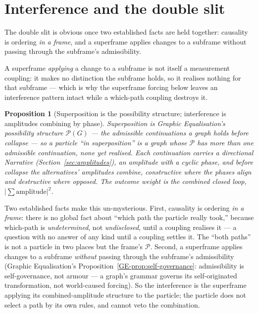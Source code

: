 \documentclass[11pt,a4paper]{article}
\newtheorem{proposition}[definition]{Proposition}
\theoremstyle{remark}\newtheorem{remark}[definition]{Remark}
\begin{document}
\section{Interference and the double slit}\label{sec:interference}
The double slit is obvious once two established facts are held together: causality
is ordering \emph{in a frame}, and a superframe applies changes to a subframe
without passing through the subframe's admissibility.

A superframe \emph{applying} a change to a subframe is not itself a measurement
coupling: it makes no distinction the subframe holds, so it realises nothing for
that subframe --- which is why the superframe forcing below leaves an interference
pattern intact while a which-path coupling destroys it.

\begin{proposition}[Superposition is the possibility structure; interference is amplitudes combining by phase]\label{prop:interference}
Superposition is Graphic Equalisation's possibility structure $\mathcal P(G)$ ---
the admissible continuations a graph holds before collapse --- so a particle ``in
superposition'' is a graph whose $\mathcal P$ has more than one admissible
continuation, none yet realised. Each continuation carries a directional Narrative
(Section~\ref{sec:amplitudes}), an amplitude with a cyclic phase, and before
collapse the alternatives' amplitudes combine, constructive where the phases align
and destructive where opposed. The outcome weight is the combined closed loop,
$|\sum\text{amplitude}|^{2}$.
\end{proposition}

Two established facts make this un-mysterious. First, causality is ordering
\emph{in a frame}: there is no global fact about ``which path the particle really
took,'' because which-path is \emph{undetermined}, not \emph{undisclosed}, until a
coupling realises it --- a question with no answer of any kind until a coupling settles
it. The ``both paths'' is not a particle in two places but the frame's
$\mathcal P$. Second, a superframe applies changes to a subframe \emph{without}
passing through the subframe's admissibility (Graphic Equalisation's
Proposition~\ref{GE-prop:self-governance}: admissibility is self-governance, not armour --- a graph's
grammar governs its self-originated transformation, not world-caused forcing). So the interference is the superframe
applying its combined-amplitude structure to the particle; the particle does not
select a path by its own rules, and cannot veto the combination.
\end{document}
